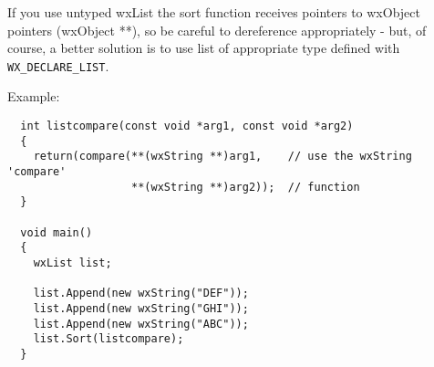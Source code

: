 If you use untyped wxList the sort function receives pointers to wxObject
pointers (wxObject **), so be careful to dereference appropriately - but,
of course, a better solution is to use list of appropriate type defined with
{\tt WX\_DECLARE\_LIST}.

Example:

\begin{verbatim}
  int listcompare(const void *arg1, const void *arg2)
  {
    return(compare(**(wxString **)arg1,    // use the wxString 'compare'
                   **(wxString **)arg2));  // function
  }

  void main()
  {
    wxList list;

    list.Append(new wxString("DEF"));
    list.Append(new wxString("GHI"));
    list.Append(new wxString("ABC"));
    list.Sort(listcompare);
  }
\end{verbatim}
